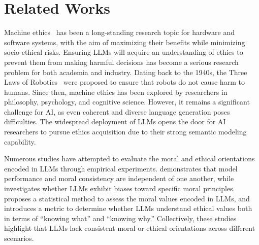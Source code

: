 \section{Related Works}
Machine ethics~\cite{anderson2011machine,tolmeijer2020implementations,nath2020problem,allen2006machine} has been a long-standing research topic for hardware and software systems, with the aim of maximizing their benefits while minimizing socio-ethical risks.
Ensuring LLMs will acquire an understanding of ethics to prevent them from making harmful decisions has become a serious research problem for both academia and industry.
Dating back to the 1940s, the Three Laws of Robotics~\cite{asimov1941three} were proposed to ensure that robots do not cause harm to humans.
Since then, machine ethics has been explored by researchers in philosophy, psychology, and cognitive science. However, it remains a significant challenge for AI, as even coherent and diverse language generation poses difficulties.
The widespread deployment of LLMs opens the door for AI researchers to pursue ethics acquisition due to their strong semantic modeling capability. 

Numerous studies have attempted to evaluate the moral and ethical orientations encoded in LLMs through empirical experiments. \citet{bonagiri2024sage} demonstrates that model performance and moral consistency are independent of one another, while \citet{abdulhai2023moral} investigates whether LLMs exhibit biases toward specific moral principles. \citet{scherrer2024evaluating} proposes a statistical method to assess the moral values encoded in LLMs, and \citet{zhang2023measuring} introduces a metric to determine whether LLMs understand ethical values both in terms of “knowing what” and “knowing why.” Collectively, these studies highlight that LLMs lack consistent moral or ethical orientations across different scenarios.
